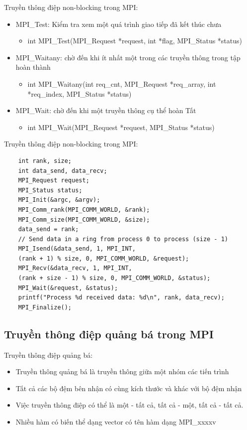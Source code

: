 \documentclass[14pt, a4paper]{article}
\numberwithin{equation}{section}
\numberwithin{figure}{section}
\numberwithin{dl}{section}
\numberwithin{md}{section}
\numberwithin{bd}{section}
\numberwithin{dn}{section}
\numberwithin{hq}{section}
\begin{document}
Truyền thông điệp non-blocking trong MPI:

\begin{itemize}
    \item MPI\_Test: Kiểm tra xem một quá trình giao tiếp đã kết thúc chưa
    \begin{itemize}
        \item int MPI\_Test(MPI\_Request *request, int *flag,
                            MPI\_Status *status) 
    \end{itemize}
    \item MPI\_Waitany: chờ đến khi ít nhất một trong các truyền thông trong tập hoàn thành
    \begin{itemize}
        \item int MPI\_Waitany(int req\_cnt, MPI\_Request *req\_array,
                               int *req\_index, MPI\_Status *status) 
    \end{itemize}
    \item MPI\_Wait: chờ đến khi một truyền thông cụ thể hoàn Tất
    \begin{itemize}
        \item int MPI\_Wait(MPI\_Request *request, MPI\_Status *status)
    \end{itemize}
\end{itemize}

Truyền thông điệp non-blocking trong MPI:

\begin{verbatim}
    int rank, size;
    int data_send, data_recv;
    MPI_Request request;
    MPI_Status status;
    MPI_Init(&argc, &argv);
    MPI_Comm_rank(MPI_COMM_WORLD, &rank);
    MPI_Comm_size(MPI_COMM_WORLD, &size);
    data_send = rank;
    // Send data in a ring from process 0 to process (size - 1)
    MPI_Isend(&data_send, 1, MPI_INT, 
    (rank + 1) % size, 0, MPI_COMM_WORLD, &request);
    MPI_Recv(&data_recv, 1, MPI_INT, 
    (rank + size - 1) % size, 0, MPI_COMM_WORLD, &status);
    MPI_Wait(&request, &status); 
    printf("Process %d received data: %d\n", rank, data_recv);
    MPI_Finalize();
\end{verbatim}

\subsection{Truyền thông điệp quảng bá trong MPI}

Truyền thông điệp quảng bá:

\begin{itemize}
    \item Truyền thông quảng bá là truyền thông giữa một nhóm các tiến trình
    \item Tất cả các bộ đệm bên nhận có cùng kích thước và khác với bộ đệm nhận 
    \item Việc truyền thông điệp có thể là một - tất cả, tất cả - một, tất cả - tất cả.
    \item Nhiều hàm có biến thể dạng vector có tên hàm dạng MPI\_xxxxv
\end{itemize}
\end{document}
